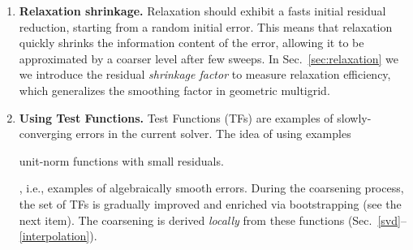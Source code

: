 \documentclass{article}
\begin{document}
\begin{enumerate}
    \item {\bf Relaxation shrinkage.} Relaxation should exhibit a fasts initial residual reduction, starting from a random initial error. This means that relaxation quickly shrinks the information content of the error, allowing it to be approximated by a coarser level after few sweeps. In Sec.~\ref{sec:relaxation} we
    we introduce the residual {\it shrinkage factor} to measure relaxation efficiency, which generalizes the smoothing factor \cite[Sec.~3.1]{guide} in geometric multigrid.
    \item {\bf Using Test Functions.} Test Functions (TFs) are examples of slowly-converging errors in the current solver. The idea of using examples 
    
    unit-norm functions with small residuals.
    
    
    \cite{lamg, bamg}, i.e., examples of algebraically smooth errors. During the coarsening process, the set of TFs is gradually improved and enriched via bootstrapping (see the next item). The coarsening is derived {\it locally} from these functions (Sec.~\ref{svd}--\ref{interpolation}).
    

\end{enumerate}
\end{document}
